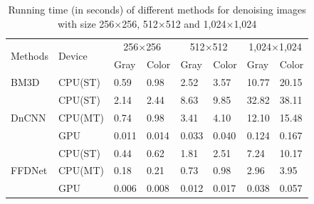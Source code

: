 \documentclass[journal]{IEEEtran}
\begin{document}
\begin{table}[!htbp]\footnotesize{}
\caption{Running time (in seconds) of different methods for denoising images with size 256$\times$256, 512$\times$512 and 1,024$\times$1,024}
\center
\begin{tabular}{|p{0.9cm}<{\centering}|p{1cm}<{\centering}|p{0.56cm}<{\centering}|p{0.56cm}<{\centering}|p{0.56cm}<{\centering}|p{0.56cm}<{\centering}|p{0.56cm}<{\centering}|p{0.56cm}<{\centering}|}%
  \hline
  \multirow{2}{*}{Methods} & \multirow{2}{*}{Device} & \multicolumn{2}{c|}{\scriptsize 256$\times$256}   & \multicolumn{2}{c|}{\scriptsize 512$\times$512}  & \multicolumn{2}{c|}{\scriptsize 1,024$\times$1,024}  \\ %
        &   & \cellcolor[rgb]{.9,.9,.9} Gray & \cellcolor[rgb]{.75,.75,.75}Color   & \cellcolor[rgb]{.9,.9,.9}Gray  & \cellcolor[rgb]{.75,.75,.75}Color  & \cellcolor[rgb]{.9,.9,.9}Gray & \cellcolor[rgb]{.75,.75,.75}Color  \\ \hline
  BM3D& CPU(ST)  & \cellcolor[rgb]{.9,.9,.9}0.59 & \cellcolor[rgb]{.75,.75,.75}0.98 & \cellcolor[rgb]{.9,.9,.9}2.52 & \cellcolor[rgb]{.75,.75,.75}3.57  & \cellcolor[rgb]{.9,.9,.9}10.77 & \cellcolor[rgb]{.75,.75,.75}20.15 \\\hline%
                                        &  CPU(ST)  & \cellcolor[rgb]{.9,.9,.9}2.14  & \cellcolor[rgb]{.75,.75,.75}2.44 & \cellcolor[rgb]{.9,.9,.9}8.63 & \cellcolor[rgb]{.75,.75,.75}9.85 & \cellcolor[rgb]{.9,.9,.9}32.82& \cellcolor[rgb]{.75,.75,.75}38.11 \\
   DnCNN & CPU(MT)  & \cellcolor[rgb]{.9,.9,.9}0.74& \cellcolor[rgb]{.75,.75,.75}0.98 &\cellcolor[rgb]{.9,.9,.9}3.41 & \cellcolor[rgb]{.75,.75,.75}4.10 & \cellcolor[rgb]{.9,.9,.9}12.10 & \cellcolor[rgb]{.75,.75,.75}15.48 \\%
                                         &  GPU  & \cellcolor[rgb]{.9,.9,.9}0.011 & \cellcolor[rgb]{.75,.75,.75}0.014 &  \cellcolor[rgb]{.9,.9,.9}0.033& \cellcolor[rgb]{.75,.75,.75}0.040 & \cellcolor[rgb]{.9,.9,.9}0.124& \cellcolor[rgb]{.75,.75,.75}0.167  \\\hline
           & CPU(ST)  & \cellcolor[rgb]{.9,.9,.9}0.44& \cellcolor[rgb]{.75,.75,.75}0.62 & \cellcolor[rgb]{.9,.9,.9}1.81 & \cellcolor[rgb]{.75,.75,.75}2.51 &  \cellcolor[rgb]{.9,.9,.9}7.24 & \cellcolor[rgb]{.75,.75,.75}10.17 \\%
                     FFDNet                    &  CPU(MT)  & \cellcolor[rgb]{.9,.9,.9}0.18  &\cellcolor[rgb]{.75,.75,.75}0.21 & \cellcolor[rgb]{.9,.9,.9}0.73 & \cellcolor[rgb]{.75,.75,.75}0.98 &  \cellcolor[rgb]{.9,.9,.9}2.96 & \cellcolor[rgb]{.75,.75,.75}3.95\\
                                         &  GPU  & \cellcolor[rgb]{.9,.9,.9}0.006  &\cellcolor[rgb]{.75,.75,.75}0.008 & \cellcolor[rgb]{.9,.9,.9}0.012 & \cellcolor[rgb]{.75,.75,.75}0.017 &  \cellcolor[rgb]{.9,.9,.9}0.038 & \cellcolor[rgb]{.75,.75,.75}0.057\\
  \hline
\end{tabular}
\label{table4}%
\end{table}
\end{document}
